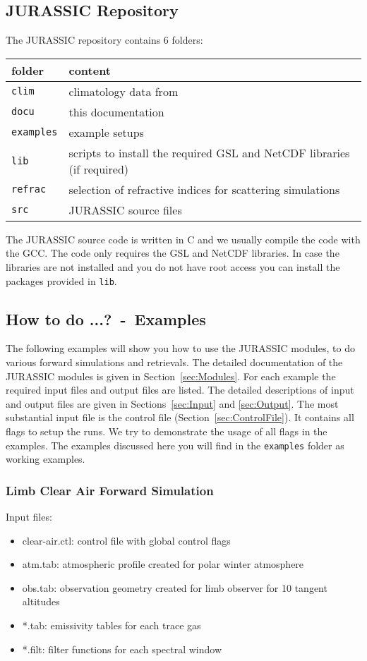 \subsection{JURASSIC Repository}
The JURASSIC repository contains 6 folders:
\begin{table}[!h]
\begin{tabular}{l|l}
folder            & content \\
\hline
\texttt{clim}     & climatology data from \citet{Remedios2007}\\
\texttt{docu}     & this documentation \\
\texttt{examples} & example setups \\
\texttt{lib}      & scripts to install the required GSL and NetCDF libraries (if required)\\
\texttt{refrac}   & selection of refractive indices for scattering simulations \\
\texttt{src}      & JURASSIC source files \\
\end{tabular}
\end{table}

The JURASSIC source code is written in C and we usually compile the code with the GCC. The code only requires the GSL and NetCDF libraries. In case the libraries are not installed and you do not have root access you can install the packages provided in \texttt{lib}.

\subsection{How to do ...?~-~Examples}
The following examples will show you how to use the JURASSIC modules, to do various forward simulations and retrievals. The detailed documentation of the JURASSIC modules is given in Section~\ref{sec:Modules}. For each example the required input files and output files are listed. The detailed descriptions of input and output files are given in Sections~\ref{sec:Input} and \ref{sec:Output}. The most substantial input file is the control file (Section~\ref{sec:ControlFile}). It contains all flags to setup the runs. We try to demonstrate the usage of all flags in the examples. The examples discussed here you will find in the \texttt{examples} folder as working examples.

\subsubsection{Limb Clear Air Forward Simulation}
\label{sec:LimbClear}
Input files:
\begin{itemize}
\item clear-air.ctl: control file with global control flags
\item atm.tab: atmospheric profile created for polar winter atmosphere
\item obs.tab: observation geometry created for limb observer for 10 tangent altitudes
\item *.tab: emissivity tables for each trace gas
\item *.filt: filter functions for each spectral window
\end{itemize}

